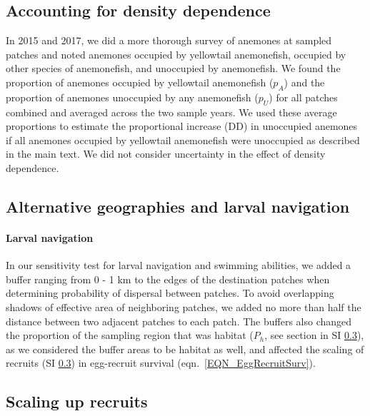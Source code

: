 \documentclass[12pt, oneside]{article}   	%
\begin{document}

\subsection{Accounting for density dependence} \label{APP_SEC_METHODS_DD}

In 2015 and 2017, we did a more thorough survey of anemones at sampled patches and noted anemones occupied by yellowtail anemonefish, occupied by other species of anemonefish, and unoccupied by anemonefish. We found the proportion of anemones occupied by yellowtail anemonefish ($p_A$) and the proportion of anemones unoccupied by any anemonefish ($p_U$) for all patches combined and averaged across the two sample years. We used these average proportions to estimate the proportional increase (DD) in unoccupied anemones if all anemones occupied by yellowtail anemonefish were unoccupied as described in the main text. We did not consider uncertainty in the effect of density dependence.

\subsection{Alternative geographies and larval navigation} \label{APP_SEC_METHODS_Larval_nav}

\paragraph*{Larval navigation} %

In our sensitivity test for larval navigation and swimming abilities, we added a buffer ranging from 0 - 1 km to the edges of the destination patches when determining probability of dispersal between patches. To avoid overlapping shadows of effective area of neighboring patches, we added no more than half the distance between two adjacent patches to each patch. The buffers also changed the proportion of the sampling region that was habitat ($P_h$, see section in SI \ref{APP_SEC_METHODS_ScalingUpRecruits}), as we considered the buffer areas to be habitat as well, and affected the scaling of recruits (SI \ref{APP_SEC_METHODS_ScalingUpRecruits}) in egg-recruit survival (eqn.\ \ref{EQN_EggRecruitSurv}).

\subsection{Scaling up recruits} \label{APP_SEC_METHODS_ScalingUpRecruits}
\end{document}
